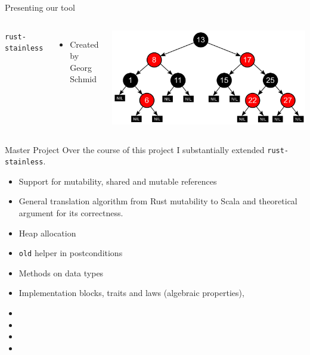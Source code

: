 \maketitle

\begin{frame}{Presenting our tool}
  \begin{columns}
  {\Large\texttt{rust-stainless}}
  \begin{itemize}
  \item Created by Georg Schmid
  \end{itemize}

  \centering
  \includegraphics[width=\textwidth]{img/rbtree.png}
\end{columns}
\end{frame}

\begin{frame}{Master Project}
Over the course of this project I substantially extended \texttt{rust-stainless}.
\begin{itemize}
\item Support for mutability, shared and mutable references
\item {General translation algorithm from Rust mutability to Scala and theoretical argument for its correctness.}
\item Heap allocation
\item \lstinline!old! helper in postconditions
\item Methods on data types
\item {Implementation blocks, traits and laws (algebraic properties),}
\item {}
\item {}
\item {}
\item {}
\end{itemize}
\end{frame}

